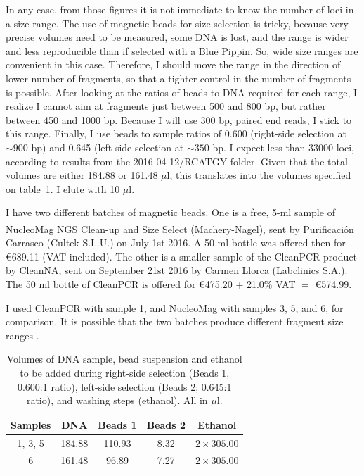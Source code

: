 \documentclass[a4paper,12pt]{article}
\begin{document}
In any case, from those figures it is not immediate to know the number of loci in a size range. The use of magnetic beads for size selection is tricky, because very precise volumes need to be measured, some DNA is lost, and the range is wider and less reproducible than if selected with a Blue Pippin. So, wide size ranges are convenient in this case. Therefore, I should move the range in the direction of lower number of fragments, so that a tighter control in the number of fragments is possible. After looking at the ratios of beads to DNA required for each range, I realize I cannot aim at fragments just between 500 and 800 bp, but rather between 450 and 1000 bp. Because I will use 300 bp, paired end reads, I stick to this range. Finally, I use beads to sample ratios of 0.600 (right-side selection at $\sim900$ bp) and 0.645 (left-side selection at $\sim350$ bp. I expect less than 33000 loci, according to results from the 2016-04-12/RCATGY folder. Given that the total volumes are either 184.88 or 161.48 $\mu$l, this translates into the volumes specified on table~\ref{tau:sizeselection}. I elute with 10 $\mu$l.

I have two different batches of magnetic beads. One is a free, 5-ml sample of NucleoMag\textsuperscript{\textregistered} NGS Clean-up and Size Select (Machery-Nagel), sent by Purificación Carrasco (Cultek S.L.U.) on July 1st 2016. A 50 ml bottle was offered then for \euro{}689.11 (VAT included). The other is a smaller sample of the CleanPCR product by CleanNA, sent on September 21st 2016 by Carmen Llorca (Labclinics S.A.). The 50 ml bottle of CleanPCR is offered for \euro{}475.20 + 21.0\% VAT $=$ \euro{}574.99.

I used CleanPCR with sample 1, and NucleoMag with samples 3, 5, and 6, for comparison. It is possible that the two batches produce different fragment size ranges \citep{Meyer2010}.

\begin{table}
\begin{center}
\caption{Volumes of DNA sample, bead suspension and ethanol to be added during right-side selection (Beads 1, 0.600:1 ratio), left-side selection (Beads 2; 0.645:1 ratio), and washing steps (ethanol). All in $\mu$l.}\label{tau:sizeselection}
\vspace*{0.3cm}
\begin{tabular}{ccccc}
\toprule
Samples&DNA&Beads 1&Beads 2&Ethanol\\
\midrule
1, 3, 5&184.88&110.93&8.32&$2\times 305.00$\\
6&161.48&96.89&7.27&$2\times 305.00$\\
\bottomrule
\end{tabular}
\end{center}
\end{table} 
\end{document}
